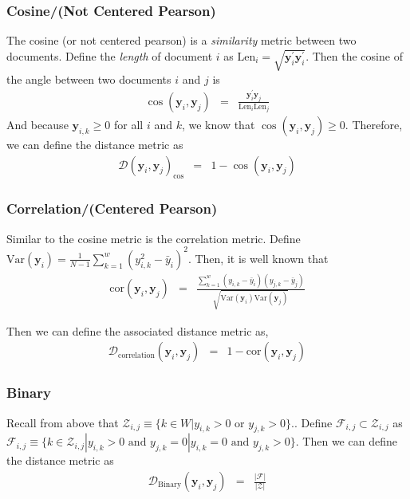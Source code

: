\documentclass[11pt,letterpaper]{article}
\numberwithin{equation}{section}
\begin{document}
\subsubsection{Cosine/(Not Centered Pearson)}
The cosine (or not centered pearson) is a \emph{similarity} metric
between two documents. Define the \emph{length} of document $i$ as
$\text{Len}_i  =  \sqrt{\boldsymbol{y}_i^{'} \boldsymbol{y}_i^{'}
}.$  Then the cosine of the angle between two documents $i$ and $j$
is
\begin{eqnarray}
\cos (\boldsymbol{y}_i, \boldsymbol{y}_j) & = &
\frac{\boldsymbol{y}_i ^{'} \boldsymbol{y}_j }{\text{Len}_i
\text{Len}_j} \nonumber
\end{eqnarray}
And because $\boldsymbol{y}_{i,k} \geq 0$ for all $i$ and $k$, we
know that $\cos (\boldsymbol{y}_i, \boldsymbol{y}_j) \geq 0$.
Therefore, we can define the distance metric as
\begin{eqnarray}
\mathcal{D}( \boldsymbol{y}_i , \boldsymbol{y}_j )_{\cos} & = & 1-
\cos (\boldsymbol{y}_i, \boldsymbol{y}_j) \nonumber
\end{eqnarray}
\subsubsection{Correlation/(Centered Pearson) }
Similar to the cosine metric is the correlation metric.  Define
$\text{Var}(\boldsymbol{y}_i)  = \frac{1}{N-1}\sum_{k=1}^{w}
(y_{i,k}^2 - \bar{y}_{i} )^2 $.  Then, it is well known that
\begin{eqnarray}
\text{cor}(\boldsymbol{y}_i, \boldsymbol{y}_j) & = &
\frac{\sum_{k=1}^{w} (y_{i,k} - \bar{y}_i )(y_{j,k} - \bar{y}_j)}{
\sqrt{\text{Var}(\boldsymbol{y}_i) \text{Var}(\boldsymbol{y}_j) }}
\nonumber
\end{eqnarray}

Then we can define the associated distance metric as,
\begin{eqnarray}
\mathcal{D}_{\text{correlation}}(\boldsymbol{y}_i, \boldsymbol{y}_j)
& = & 1 - \text{cor}(\boldsymbol{y}_i, \boldsymbol{y}_j)  \nonumber
\end{eqnarray}

\subsubsection{Binary}
Recall from above that $\mathcal{Z}_{i,j}  \equiv \{k \in W |
y_{i,k} > 0 \text{ or } y_{j,k} > 0 \}.$.  Define $\mathcal{F}_{i,j}
\subset \mathcal{Z}_{i,j}$ as $ \mathcal{F}_{i,j} \equiv \{ k \in
\mathcal{Z}_{i,j} | y_{i,k} > 0 \text{ and } y_{j,k} = 0 | y_{i,k}
=0  \text{ and } y_{j,k} > 0 \}.$  Then we can define the distance
metric as
\begin{eqnarray}
\mathcal{D}_{\text{Binary} }(\boldsymbol{y}_i, \boldsymbol{y}_j) & =
& \frac{|\mathcal{F}|}{|\mathcal{Z}|} \nonumber
\end{eqnarray}
\end{document}
